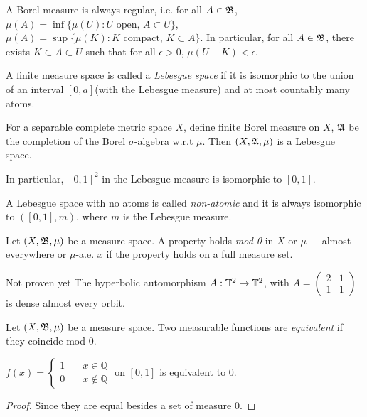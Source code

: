 \documentclass[12pt,a4paper]{article}
\begin{document}
	
	\begin{proposition}{}{}
		A Borel measure is always regular, i.e. for all $A\in\mathfrak{B}$, $\mu(A)=\inf\{\mu(U): U\text{ open, } A\subset U\}$, $\mu(A)=\sup\{\mu(K): K\text{ compact, } K\subset A\}$. In particular, for all $A\in\mathfrak{B}$, there exists $K\subset A \subset U$ such that for all $\epsilon>0$, $\mu(U-K)<\epsilon$.
	\end{proposition}
	
	\begin{definition}{}{}
		A finite measure space is called a \emph{Lebesgue space} if it is isomorphic to the union of an interval $[0,a]$(with the Lebesgue measure) and at most countably many atoms.
	\end{definition}

	\begin{lemma}{}{}
		For a separable complete metric space $X$, define finite Borel measure on $X$, $\mathfrak{A}$ be the completion of the Borel $\sigma$-algebra w.r.t $\mu$. Then $(X,\mathfrak{A}, \mu)$ is a Lebesgue space. 
		
		In particular, $[0,1]^2$ in the Lebesgue measure is isomorphic to $[0,1]$.
	\end{lemma}
	\begin{definition}{}{}
		A Lebesgue space with no atoms is called \emph{non-atomic} and it is always isomorphic to $([0,1],m)$, where $m$ is the Lebesgue measure.
	\end{definition}
	
	\begin{definition}{}{}
		Let $(X,\mathfrak{B},\mu)$ be a measure space. A property holds \emph{mod 0} in $X$ or $\mu-$ almost everywhere or $\mu$-a.e. $x$ if the property holds on a full measure set.
	\end{definition}

	\begin{example}{Not proven yet}{}
		The hyperbolic automorphism $A:\mathbb{T}^2\rightarrow \mathbb{T}^2$, with $A=\begin{pmatrix}
			2 & 1\\
			1 & 1
		\end{pmatrix}$ is dense almost every orbit.
	\end{example}
	
	\begin{definition}{}{}
		Let $(X,\mathfrak{B},\mu)$ be a measure space. Two measurable functions are \emph{equivalent} if they coincide mod 0.
	\end{definition}
	\begin{example}{}{}
		$f(x)=\begin{cases}
			1  \quad &x\in \mathbb{Q}\\
			0 &  x\notin \mathbb{Q}
		\end{cases}$
	on $[0,1]$ is equivalent to $0$.
	\end{example}
	\begin{proof}
		Since they are equal besides a set of measure 0.
	\end{proof}
	
\end{document}

